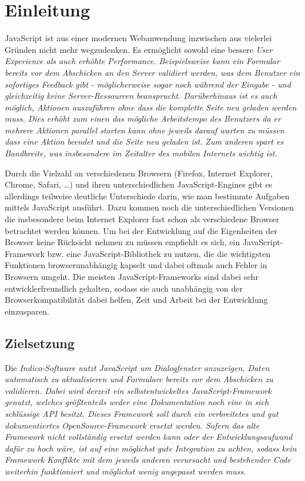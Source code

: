 \chapter{Einleitung}

JavaScript ist aus einer modernen Webanwendung inzwischen aus vielerlei Gründen nicht mehr
wegzudenken. Es ermöglicht sowohl eine bessere \em{User Experience} als auch erhöhte Performance.
Beispielsweise kann ein Formular bereits vor dem Abschicken an den Server validiert werden, was dem
Benutzer ein sofortiges Feedback gibt - möglicherweise sogar noch während der Eingabe - und
gleichzeitig keine Server-Ressourcen beansprucht. Darüberhinaus ist es auch möglich, Aktionen
auszuführen ohne dass die komplette Seite neu geladen werden muss. Dies erhöht zum einen das
mögliche Arbeitstempo des Benutzers da er mehrere Aktionen parallel starten kann ohne jeweils darauf
warten zu müssen dass eine Aktion beendet und die Seite neu geladen ist. Zum anderen spart es
Bandbreite, was insbesondere im Zeitalter des mobilen Internets wichtig ist.

Durch die Vielzahl an verschiedenen Browsern (Firefox, Internet Explorer, Chrome, Safari, \ldots) und ihren
unterschiedlichen JavaScript-Engines gibt es allerdings teilweise deutliche Unterschiede darin, wie
man bestimmte Aufgaben mittels JavaScript ausführt. Dazu kommen noch die unterschiedlichen Versionen
die insbesondere beim Internet Explorer fast schon als verschiedene Browser betrachtet werden
können. Um bei der Entwicklung auf die Eigenheiten der Browser keine Rücksicht nehmen zu müssen
empfiehlt es sich, ein JavaScript-Framework bzw. eine JavaScript-Bibliothek zu nutzen, die die
wichtigsten Funktionen browserunabhängig kapselt und dabei oftmals auch Fehler in Browsern umgeht.
Die meisten JavaScript-Frameworks sind dabei sehr entwicklerfreundlich gehalten, sodass sie auch
unabhängig von der Browserkompatibilität dabei helfen, Zeit und Arbeit bei der Entwicklung
einzusparen.


\section{Zielsetzung}

Die \em{Indico}-Software nutzt JavaScript um Dialogfenster anzuzeigen, Daten automatisch zu
aktualisieren und Formulare bereits vor dem Abschicken zu validieren. Dabei wird derzeit ein
selbstentwickeltes JavaScript-Framework genutzt, welches größtenteils weder eine Dokumentation
noch eine in sich schlüssige API besitzt. Dieses Framework soll durch ein verbreitetes und gut
dokumentiertes OpenSource-Framework ersetzt werden. Sofern das alte Framework nicht vollständig
ersetzt werden kann oder der Entwicklungsaufwand dafür zu hoch wäre, ist auf eine möglichst gute
Integration zu achten, sodass kein Framework Konflikte mit dem jeweils anderen verursacht und
bestehender Code weiterhin funktioniert und möglichst wenig angepasst werden muss.

